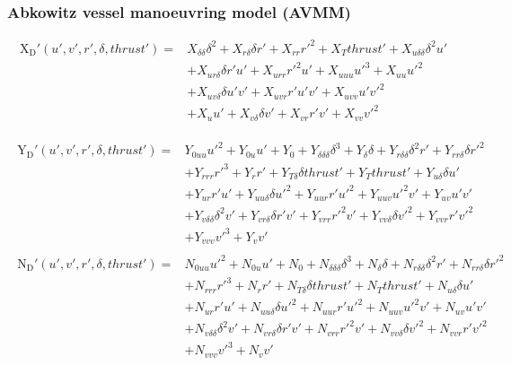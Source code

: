 \subsubsection*{\normalfont \textbf{Abkowitz vessel manoeuvring model (AVMM) \cite{abkowitz_ship_1964}}}
\begin{equation}\label{equation:02.01_manoeuvring models:eqxabkowitz}
\begin{split}
\operatorname{X_{D}'}{\left(u',v',r',\delta,thrust' \right)} = & X_{\delta\delta} \delta^{2} + X_{r\delta} \delta r' + X_{rr} r'^{2} + X_{T} thrust' + X_{u\delta\delta} \delta^{2} u' \\ 
& + X_{ur\delta} \delta r' u' + X_{urr} r'^{2} u' + X_{uuu} u'^{3} + X_{uu} u'^{2} \\ 
& + X_{uv\delta} \delta u' v' + X_{uvr} r' u' v' + X_{uvv} u' v'^{2} \\
& + X_{u} u' + X_{v\delta} \delta v' + X_{vr} r' v' + X_{vv} v'^{2} 
\end{split}
\end{equation}

\begin{equation}\label{equation:02.01_manoeuvring models:eqyabkowitz}
\begin{split}\begin{split}
\operatorname{Y_{D}'}{\left(u',v',r',\delta,thrust' \right)} = & Y_{0uu} u'^{2} + Y_{0u} u' + Y_{0} + Y_{\delta\delta\delta} \delta^{3} + Y_{\delta} \delta + Y_{r\delta\delta} \delta^{2} r' + Y_{rr\delta} \delta r'^{2} \\ & + Y_{rrr} r'^{3} + Y_{r} r' + Y_{T\delta} \delta thrust' + Y_{T} thrust' + Y_{u\delta} \delta u' \\ & + Y_{ur} r' u' + Y_{uu\delta} \delta u'^{2} + Y_{uur} r' u'^{2} + Y_{uuv} u'^{2} v' + Y_{uv} u' v' \\ & + Y_{v\delta\delta} \delta^{2} v' + Y_{vr\delta} \delta r' v' + Y_{vrr} r'^{2} v' + Y_{vv\delta} \delta v'^{2} + Y_{vvr} r' v'^{2} \\ & + Y_{vvv} v'^{3} + Y_{v} v' 
\end{split}\end{split}
\end{equation}\begin{equation}\label{equation:02.01_manoeuvring models:eqnabkowitz}
\begin{split}\begin{split}
\operatorname{N_{D}'}{\left(u',v',r',\delta,thrust' \right)} = & N_{0uu} u'^{2} + N_{0u} u' + N_{0} + N_{\delta\delta\delta} \delta^{3} + N_{\delta} \delta + N_{r\delta\delta} \delta^{2} r' + N_{rr\delta} \delta r'^{2} \\ & + N_{rrr} r'^{3} + N_{r} r' + N_{T\delta} \delta thrust' + N_{T} thrust' + N_{u\delta} \delta u' \\ & + N_{ur} r' u' + N_{uu\delta} \delta u'^{2} + N_{uur} r' u'^{2} + N_{uuv} u'^{2} v' + N_{uv} u' v' \\ & + N_{v\delta\delta} \delta^{2} v' + N_{vr\delta} \delta r' v' + N_{vrr} r'^{2} v' + N_{vv\delta} \delta v'^{2} + N_{vvr} r' v'^{2} \\ & + N_{vvv} v'^{3} + N_{v} v' 
\end{split}\end{split}
\end{equation}
\sphinxAtStartPar

